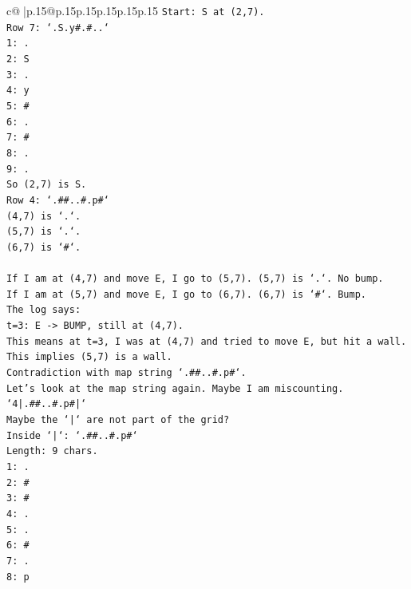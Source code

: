 \documentclass{article}
\begin{document}
{\begin{supertabular}{c@{$\;$}|p{.15\linewidth}@{}p{.15\linewidth}p{.15\linewidth}p{.15\linewidth}p{.15\linewidth}p{.15\linewidth}}
{{{\texttt{Start: S at (2,7).} \\
\texttt{Row 7: `.S.y\#.\#..`} \\
\texttt{1: .} \\
\texttt{2: S} \\
\texttt{3: .} \\
\texttt{4: y} \\
\texttt{5: \#} \\
\texttt{6: .} \\
\texttt{7: \#} \\
\texttt{8: .} \\
\texttt{9: .} \\
\texttt{So (2,7) is S.} \\
\texttt{Row 4: `.\#\#..\#.p\#`} \\
\texttt{(4,7) is `.`.} \\
\texttt{(5,7) is `.`.} \\
\texttt{(6,7) is `\#`.} \\
\\ 
\texttt{If I am at (4,7) and move E, I go to (5,7). (5,7) is `.`. No bump.} \\
\texttt{If I am at (5,7) and move E, I go to (6,7). (6,7) is `\#`. Bump.} \\
\texttt{The log says:} \\
\texttt{t=3: E {-}> BUMP, still at (4,7).} \\
\texttt{This means at t=3, I was at (4,7) and tried to move E, but hit a wall.} \\
\texttt{This implies (5,7) is a wall.} \\
\texttt{Contradiction with map string `.\#\#..\#.p\#`.} \\
\texttt{Let's look at the map string again. Maybe I am miscounting.} \\
\texttt{`4|.\#\#..\#.p\#|`} \\
\texttt{Maybe the `|` are not part of the grid?} \\
\texttt{Inside `|`: `.\#\#..\#.p\#`} \\
\texttt{Length: 9 chars.} \\
\texttt{1: .} \\
\texttt{2: \#} \\
\texttt{3: \#} \\
\texttt{4: .} \\
\texttt{5: .} \\
\texttt{6: \#} \\
\texttt{7: .} \\
\texttt{8: p} \\
}}}
\end{supertabular}}
\end{document}
